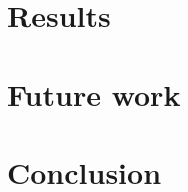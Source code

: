 \documentclass[conference]{IEEEtran}
\begin{document}
\section{Results} 
\label{sec:results}


\section{Future work} 
\label{sec:future}


\section{Conclusion}
\label{sec:conclusion}






\end{document}
